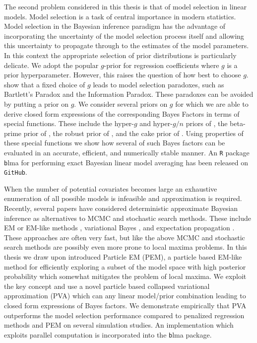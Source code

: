 \documentclass[11pt]{article}
\begin{document}
The second problem considered in this thesis is that of model selection in linear models.
Model selection is a task of central importance in modern statistics. Model selection in the Bayesian
inference paradigm has the advantage of incorporating the uncertainty of the model selection process 
itself and allowing this uncertainty to propagate through to the estimates of the model parameters. 
In this context the appropriate selection of prior distributions is particularly delicate.
We adopt the popular $g$-prior \cite{Zellner1986} for regression coefficients where $g$ is a prior
hyperparameter. However, this raises the question of how best to choose $g$.
\cite{Liang2008}  show that a fixed choice of $g$ leads to model selection paradoxes,
such as Bartlett's Paradox and the Information Paradox. These paradoxes can be avoided by putting a 
prior on $g$. We consider several priors on $g$ for which we are able to derive closed form expressions of the corresponding Bayes Factors in terms of special functions. 
These include the hyper-$g$ and hyper-$g/n$ priors of \cite{Liang2008}, the beta-prime prior of 
\cite{Maruyama2011}, the robust prior of \cite{Bayarri2012}, and the cake prior of \cite{OrmerodEtal2017}. 
Using properties of these special
functions we show how several of such Bayes factors can be evaluated in an accurate, efficient, and 
numerically stable manner. An {\tt R} package {\texttt blma} for performing exact Bayesian linear 
model averaging has been released on {\tt GitHub}.

When the number of potential covariates becomes large an exhaustive enumeration of all possible 
models is infeasible and approximation is required. Recently, several papers have considered 
deterministic approximate Bayesian inference as alternatives to MCMC and stochastic search methods.
These include EM or EM-like methods  \citep{Rockova2014,Rockova2017}, variational Bayes
\citep{Logsdon2010,Carbonetto2011,wandormerod2011,ormerod2017},
and expectation propagation \citep{HernandezLobato2015}. These approaches are often very fast, but 
like the above MCMC and stochastic search methods are possibly even more prone to local maxima 
problems. In this thesis we draw upon \cite{Rockova2017} introduced  Particle EM (PEM), a 
particle based EM-like method for efficiently exploring a subset of the model space with high 
posterior probability which somewhat mitigates the problem of local maxima. We exploit the key 
concept and use a novel particle based collapsed variational approximation (PVA) which can any 
linear model/prior combination leading to closed form expressions of Bayes factors. We demonstrate 
empirically that PVA outperforms the model selection performance compared to penalized regression
methods and PEM on several simulation studies. An implementation which exploits parallel computation
is incorporated into the  {\texttt blma} package.
 
{\small 


}
\end{document}
